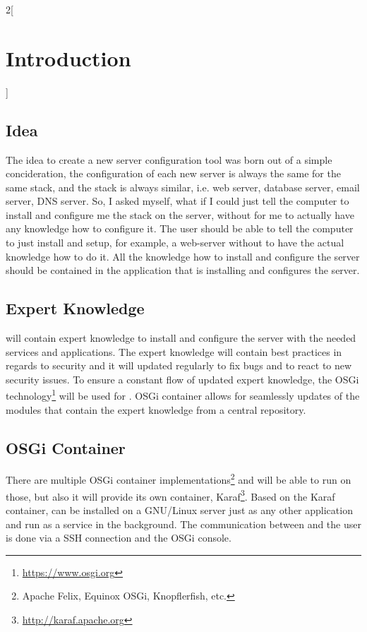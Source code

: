 \begin{multicols}{2}[\chapter{Introduction}]

\section{Idea}

The idea to create a new server configuration tool was born out of a simple concideration,
the configuration of each new server is always the same for the same stack, and the stack
is always similar, i.e. web server, database server, email server, DNS server.
So, I asked myself, what if I could just tell the computer to install and configure me the stack
on the server, without for me to actually have any knowledge how to configure it.
The user should be able to tell the computer to just install and setup, for example, a web-server
without to have the actual knowledge how to do it. All the knowledge how to 
install and configure the server should be contained in the application that is 
installing and configures the server.

\section{Expert Knowledge}

\AppName{} will contain expert knowledge to install and configure the server
with the needed services and applications. The expert knowledge will contain 
best practices in regards to security and it will updated regularly to
fix bugs and to react to new security issues.
To ensure a constant flow of updated expert knowledge, the OSGi technology\footnote{\url{https://www.osgi.org}}
will be used for \AppName{}. OSGi container allows for seamlessly updates of
the modules that contain the expert knowledge from a central repository.

\section{OSGi Container}

There are multiple OSGi container implementations\footnote{Apache Felix, Equinox OSGi, Knopflerfish, etc.} 
and \AppName{} will be able
to run on those, but also it will provide its own container, Karaf\footnote{\url{http://karaf.apache.org}}.
Based on the Karaf container, \AppName{} can be installed on a GNU/Linux server
just as any other application and run as a service in the background.
The communication between \AppName{} and the user is done via a SSH connection and the
OSGi console.


\end{multicols}
